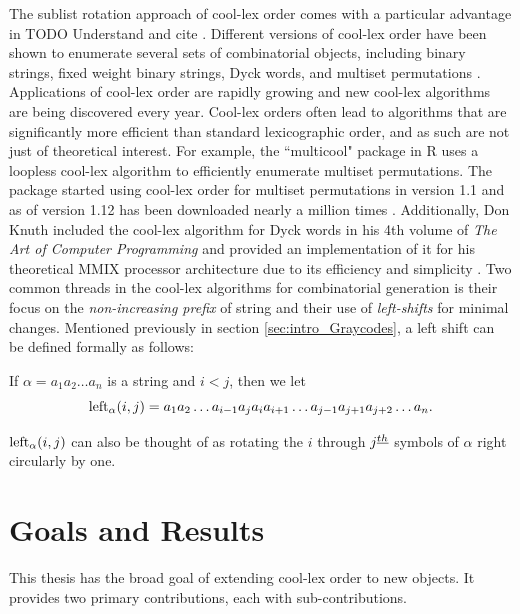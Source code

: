 The sublist rotation approach of cool-lex order comes with a particular advantage in TODO Understand and cite \cite{ruskey2012binary}. Different versions of cool-lex order have been shown to enumerate several sets of combinatorial objects, including binary strings, fixed weight binary strings, Dyck words, and multiset permutations \cite{williams2009shift}.  Applications of cool-lex order are rapidly growing and new cool-lex algorithms are being discovered every year.  Cool-lex orders often lead to algorithms that are significantly more efficient than standard lexicographic order, and as such are not just of theoretical interest.  For example, the ``multicool" package in R uses a loopless cool-lex algorithm to efficiently enumerate multiset permutations.   The package started using cool-lex order for multiset permutations in version 1.1 and as of version 1.12 has been downloaded nearly a million times \cite{multicool_2021}.  Additionally, Don Knuth included the cool-lex algorithm for Dyck words in his 4th volume of \emph{The Art of Computer Programming} and provided an implementation of it for his theoretical MMIX processor architecture due to its efficiency and simplicity \cite{knuth2015art}.
Two common threads in the cool-lex algorithms for combinatorial generation is their focus on the \emph{non-increasing prefix} of string and their use of \emph{left-shifts} for minimal changes.  Mentioned previously in section \ref{sec:intro_Graycodes}, a left shift can be defined formally as follows:

If $\alpha = a_1 a_2 \ldots a_n$ is a string and $i < j$, then we let
\begin{equation}
    \lshiftindex[\alpha]{i}{j} = a_1 a_2 \ldots a_{i-1} a_j a_{i} a_{i+1} \ldots a_{j-1} a_{j+1} a_{j+2} \ldots a_n. \label{eq:leftdef}
\end{equation}

$\lshiftindex[\alpha]{i}{j}$ can also be thought of as rotating the $i$ through $j\thh$ symbols of $\alpha$ right circularly by one.




\section{Goals and Results}


This thesis has the broad goal of extending cool-lex order to new objects.  It provides two primary contributions, each with sub-contributions.  

